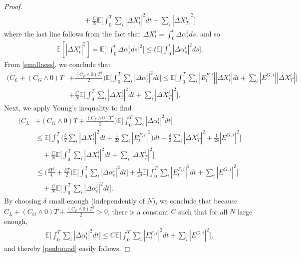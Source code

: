 \documentclass[11pt,reqno]{amsart}
\numberwithin{equation}{section}
\theoremstyle{definition}
\def\E{{\mathbb E}}
\def \E{\mathbb{E}}
\begin{document}
\begin{proof}
\begin{align}
&\qquad + \frac{C}{N}\E\bigg[\int_0^T  \sum_i |\Delta X_t^i|^2 dt +  \sum_i |\Delta X_T^i|^2 \bigg]
\end{align}
where the last line follows from the fact that $\Delta X_t^i = \int_0^t \Delta \alpha_s^i ds$, and so 
\begin{align} \label{xalphabound}
  \E[|\Delta X_t^i|^2] = \E\bigg[\Big|\int_0^t  \Delta \alpha_s^i ds\Big|^2\bigg] \leq t \E\bigg[\int_0^t |\Delta \alpha_s^i|^2 ds\bigg]. 
\end{align}
From \eqref{smallness}, we conclude that 
\begin{align*}
\Big(C_L + (C_{G} \wedge 0) T &+ \frac{(C_{F} \wedge 0) T^2}{2}\Big) \E \bigg[ \int_0^T \sum_i |\Delta \alpha_t^i|^2 dt \bigg] \leq \E \bigg[ \int_0^T \sum_i |E_t^{F,i}||\Delta X_t^i|  dt + \sum_i |E^{G,i}| |\Delta X_T^i| \bigg] \\
&+ \frac{C}{N}\E\bigg[\int_0^T  \sum_i |\Delta X_t^i|^2 dt +  \sum_i |\Delta X_T^i|^2 \bigg].
\end{align*}
Next, we apply Young's inequality to find
\begin{align*}
\Big(C_L& + (C_{G} \wedge 0) T + \frac{(C_{F} \wedge 0) T^2}{2}\Big)\E \bigg[ \int_0^T \sum_i |\Delta \alpha_t^i|^2 dt \bigg] \\
&\leq \E \bigg[ \int_0^T \bigg( \frac{\delta}{2} \sum_i |\Delta X_t^i|^2 dt +  \frac{1}{2\delta}  \sum_i |E_t^{F,i}|^2 \bigg)dt +  \frac{\delta}{2} \sum_i  |\Delta X_T^i|^2 + \frac{1}{2\delta} |E^{G,i}|^2 \bigg] \\
&\quad + \frac{C}{N}\E\bigg[\int_0^T  \sum_i |\Delta X_t^i|^2 dt +  \sum_i |\Delta X_T^i|^2 \bigg] \\
&\leq \big(\frac{\delta T^2}{4} + \frac{\delta T}{2} \big) \E\bigg[ \int_0^T \sum_i |\Delta \alpha_t^i|^2 dt \bigg] + 
\frac{1}{2 \delta} \E \bigg[ \int_0^T  \sum_i |E_t^{F,i}|^2 dt +  \sum_i |E^{G,i}|^2 \bigg] \\
&\quad + \frac{C}{N}\E\bigg[\int_0^T  \sum_i |\Delta \alpha_t^i|^2 dt\bigg].
\end{align*}
By choosing $\delta$ small enough (independently of $N$), we conclude that because $C_L + (C_G \wedge 0) T + \frac{(C_F \wedge 0) T^2}{2} > 0$, there is a constant $C$ such that for all $N$ large enough, 
\begin{align*}
\E\bigg[\int_0^T \sum_i |\Delta \alpha_t^i|^2 dt \bigg] \leq C \E \bigg[ \int_0^T  \sum_i |E_t^{F,i}|^2 dt +  \sum_i |E^{G,i}|^2 \bigg],
\end{align*}
and thereby \eqref{penbound} easily follows.
\end{proof}
\end{document}
